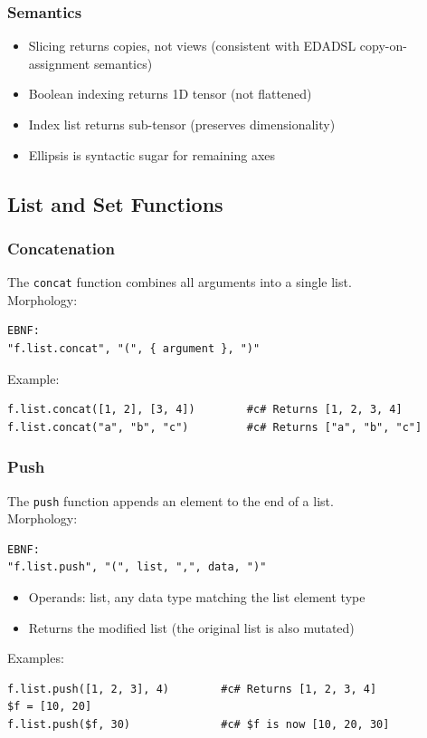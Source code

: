 \subsubsection{Semantics}
\begin{itemize}
\item Slicing returns copies, not views (consistent with EDADSL copy-on-assignment semantics)
\item Boolean indexing returns 1D tensor (not flattened)
\item Index list returns sub-tensor (preserves dimensionality)
\item Ellipsis is syntactic sugar for remaining axes
\end{itemize}


\subsection{List and Set Functions}

\subsubsection{Concatenation}
The \texttt{concat} function combines all arguments into a single list. \\
Morphology:
\begin{verbatim}
EBNF:
"f.list.concat", "(", { argument }, ")"
\end{verbatim}
Example:
\begin{verbatim}
f.list.concat([1, 2], [3, 4])        #c# Returns [1, 2, 3, 4]
f.list.concat("a", "b", "c")         #c# Returns ["a", "b", "c"]
\end{verbatim}

\subsubsection{Push}
The \texttt{push} function appends an element to the end of a list.\\
Morphology:
\begin{verbatim}
EBNF:
"f.list.push", "(", list, ",", data, ")"
\end{verbatim}
\begin{itemize}
\item Operands: list, any data type matching the list element type
\item Returns the modified list (the original list is also mutated)
\end{itemize}
Examples:
\begin{verbatim}
f.list.push([1, 2, 3], 4)        #c# Returns [1, 2, 3, 4]
$f = [10, 20]
f.list.push($f, 30)              #c# $f is now [10, 20, 30]
\end{verbatim}


